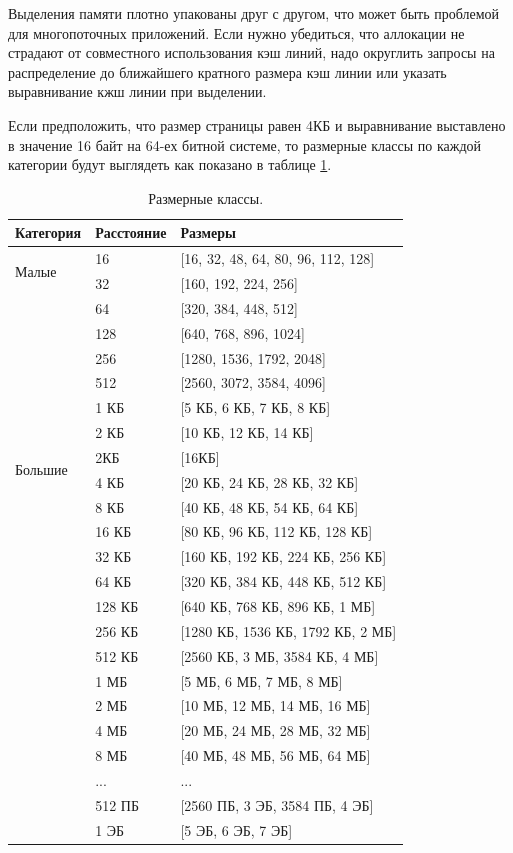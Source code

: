 Выделения памяти плотно упакованы друг с другом, что может быть проблемой для многопоточных приложений. Если нужно убедиться, что аллокации не страдают от совместного использования кэш линий, надо округлить запросы на распределение до ближайшего кратного размера кэш линии или указать выравнивание кжш линии при выделении.

Если предположить, что размер страницы равен 4КБ и выравнивание выставлено в значение 16 байт на 64-ех битной системе, то размерные классы по каждой категории будут выглядеть как показано в таблице \ref{jemalloc-size-classes}.

\begin{table}[h!]
	\begin{center}
		\begin{tabular}{l|l|l}
			\textbf{Категория} & \textbf{Расстояние} & \textbf{Размеры}\\
			\hline
			\multirow{2}{*}{Малые} & 16 & [16, 32, 48, 64, 80, 96, 112, 128]\\
			& 32 & [160, 192, 224, 256]\\
			& 64 & [320, 384, 448, 512]\\
			& 128 & [640, 768, 896, 1024]\\
			& 256 & [1280, 1536, 1792, 2048]\\
			& 512 & [2560, 3072, 3584, 4096]\\
			& 1 КБ & [5 КБ, 6 КБ, 7 КБ, 8 КБ]\\
			& 2 КБ & [10 КБ, 12 КБ, 14 КБ]\\
			\hline
			\multirow{2}{*}{Большие} & 2КБ & [16КБ]\\
			& 4 КБ &	[20 КБ, 24 КБ, 28 КБ, 32 КБ]\\
			& 8 КБ & [40 КБ, 48 КБ, 54 КБ, 64 КБ]\\
			& 16 КБ & [80 КБ, 96 КБ, 112 КБ, 128 КБ]\\
			& 32 КБ & [160 КБ, 192 КБ, 224 КБ, 256 КБ]\\
			& 64 КБ & [320 КБ, 384 КБ, 448 КБ, 512 КБ]\\
			& 128 КБ & [640 КБ, 768 КБ, 896 КБ, 1 МБ]\\
			& 256 КБ & [1280 КБ, 1536 КБ, 1792 КБ, 2 МБ]\\
			& 512 КБ & [2560 КБ, 3 МБ, 3584 КБ, 4 МБ]\\
			& 1 МБ &	[5 МБ, 6 МБ, 7 МБ, 8 МБ]\\
			& 2 МБ &	[10 МБ, 12 МБ, 14 МБ, 16 МБ]\\
			& 4 МБ &	[20 МБ, 24 МБ, 28 МБ, 32 МБ]\\
			& 8 МБ &	[40 МБ, 48 МБ, 56 МБ, 64 МБ]\\
			&  ... & ...\\
			& 512 ПБ &	[2560 ПБ, 3 ЭБ, 3584 ПБ, 4 ЭБ]\\
			& 1 ЭБ	& [5 ЭБ, 6 ЭБ, 7 ЭБ]\\
		\end{tabular}
		\caption{Размерные классы.}
		\label{jemalloc-size-classes}
	\end{center}
\end{table}

